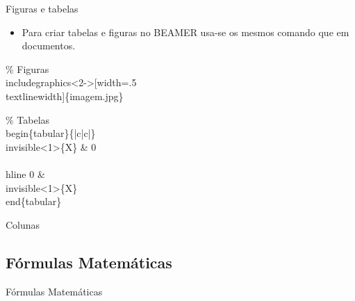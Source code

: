 \begin{frame}[fragile]{Figuras e tabelas}
    \begin{itemize}
    \item Para criar tabelas e figuras no {\footnotesize BEAMER} usa-se os mesmos comando que em documentos.
    \end{itemize}

    \begin{example}
\begin{semiverbatim}
\small \% Figuras
\\includegraphics<2->[width=.5\\textlinewidth]\{imagem.jpg\}

\% Tabelas
\\begin\{tabular\}\{|c|c|\}
    \\invisible<1>\{X\} \& 0 \\
    \\hline
    0 \& \\invisible<1>\{X\}
\\end\{tabular\}
\end{semiverbatim}
    \end{example}

\end{frame}

\begin{frame}{Colunas}
\end{frame}


\subsection{Fórmulas Matemáticas}
\begin{frame}{Fórmulas Matemáticas}

\end{frame}



